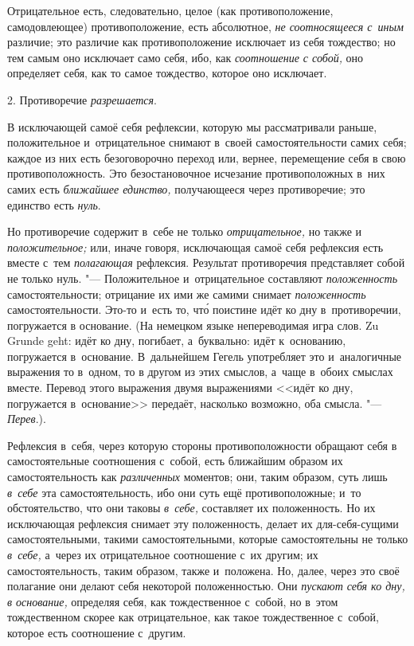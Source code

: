 Отрицательное есть, следовательно, целое (как противоположение,
самодовлеющее) противоположение, есть абсолютное,
{\em не соотносящееся с~иным} различие; это различие
как противоположение исключает из себя тождество; но тем самым оно
исключает само себя, ибо, как {\em соотношение с
собой,} оно определяет себя, как то самое тождество, которое оно исключает.


\bigskip

2. Противоречие {\em разрешается}.

В исключающей самоё себя рефлексии, которую мы рассматривали раньше,
положительное и~отрицательное снимают в~своей самостоятельности самих себя;
каждое из них есть безоговорочно переход или, вернее, перемещение себя в
свою противоположность. Это безостановочное исчезание противоположных в~них
самих есть {\em ближайшее единство,} получающееся через
противоречие; это единство есть {\em нуль}.

Но противоречие содержит в~себе не только {\em отрицательное,} но также и
{\em положительное;} или, иначе говоря, исключающая
самоё себя рефлексия есть вместе с~тем {\em полагающая}
рефлексия. Результат противоречия представляет собой не только нуль. "---
Положительное и~отрицательное составляют
{\em положенность} самостоятельности; отрицание их ими
же самими снимает {\em положенность} самостоятельности.
Это-то и~есть то, чт\'{о} поистине идёт ко дну в~противоречии, погружается в
основание. (На немецком языке непереводимая игра слов. Zu Grunde geht: идёт
ко дну, погибает, а~буквально: идёт к~основанию, погружается в~основание.
В~дальнейшем Гегель употребляет это и~аналогичные выражения то в~одном, то в
другом из этих смыслов, а~чаще в~обоих смыслах вместе. Перевод этого
выражения двумя выражениями <<идёт ко дну, погружается в~основание>>
передаёт, насколько возможно, оба смысла. "---
{\em Перев}.).

Рефлексия в~себя, через которую стороны противоположности обращают себя в
самостоятельные соотношения с~собой, есть ближайшим образом их
самостоятельность как {\em различенных} моментов; они,
таким образом, суть лишь {\em в~себе} эта
самостоятельность, ибо они суть ещё противоположные; и~то обстоятельство,
что они таковы {\em в~себе,} составляет их
положенность. Но их исключающая рефлексия снимает эту положенность, делает
их для-себя-сущими самостоятельными, такими самостоятельными, которые
самостоятельны не только {\em в~себе,} а~через их
отрицательное соотношение с~их другим; их самостоятельность, таким образом,
также и~положена. Но, далее, через это своё полагание они делают себя
некоторой положенностью. Они {\em пускают себя ко дну,
в основание,} определяя себя, как тождественное с~собой, но в~этом
тождественном скорее как отрицательное, как такое тождественное с~собой,
которое есть соотношение с~другим.

